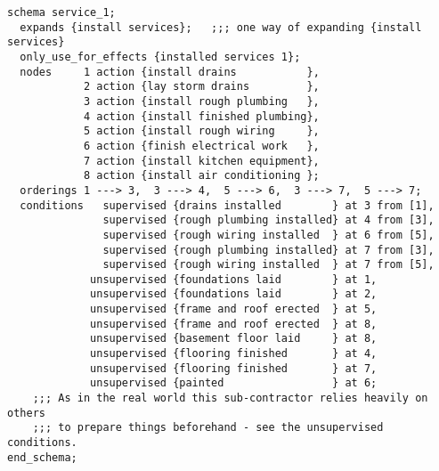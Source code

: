 \begin{verbatim}
schema service_1;
  expands {install services};   ;;; one way of expanding {install services}
  only_use_for_effects {installed services 1};
  nodes     1 action {install drains           },
            2 action {lay storm drains         },
            3 action {install rough plumbing   },
            4 action {install finished plumbing},
            5 action {install rough wiring     },
            6 action {finish electrical work   },
            7 action {install kitchen equipment},
            8 action {install air conditioning };
  orderings 1 ---> 3,  3 ---> 4,  5 ---> 6,  3 ---> 7,  5 ---> 7;
  conditions   supervised {drains installed        } at 3 from [1],
               supervised {rough plumbing installed} at 4 from [3],
               supervised {rough wiring installed  } at 6 from [5],
               supervised {rough plumbing installed} at 7 from [3],
               supervised {rough wiring installed  } at 7 from [5],
             unsupervised {foundations laid        } at 1,
             unsupervised {foundations laid        } at 2,
             unsupervised {frame and roof erected  } at 5,
             unsupervised {frame and roof erected  } at 8,
             unsupervised {basement floor laid     } at 8,
             unsupervised {flooring finished       } at 4,
             unsupervised {flooring finished       } at 7,
             unsupervised {painted                 } at 6;
    ;;; As in the real world this sub-contractor relies heavily on others
    ;;; to prepare things beforehand - see the unsupervised conditions.
end_schema;
           

\end{verbatim}
